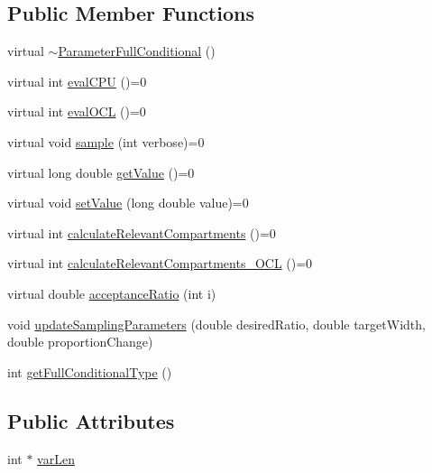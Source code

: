 \subsection*{Public Member Functions}
\begin{DoxyCompactItemize}
\item 
virtual \hyperlink{classSpatialSEIR_1_1ParameterFullConditional_a8f86a572d719ff60c9620f17ae7d99bf}{$\sim$\-Parameter\-Full\-Conditional} ()
\item 
virtual int \hyperlink{classSpatialSEIR_1_1ParameterFullConditional_a186bd19fdeb52ca4522f56fb880201dd}{eval\-C\-P\-U} ()=0
\item 
virtual int \hyperlink{classSpatialSEIR_1_1ParameterFullConditional_ac4cfb13dace7f72e8136c45d9e959eec}{eval\-O\-C\-L} ()=0
\item 
virtual void \hyperlink{classSpatialSEIR_1_1ParameterFullConditional_a651e22b15782acb6bd80be12bd476693}{sample} (int verbose)=0
\item 
virtual long double \hyperlink{classSpatialSEIR_1_1ParameterFullConditional_a901368d385809e77179b9fa7532adfec}{get\-Value} ()=0
\item 
virtual void \hyperlink{classSpatialSEIR_1_1ParameterFullConditional_adf03f213e27d26f120b574d6dd86ffc3}{set\-Value} (long double value)=0
\item 
virtual int \hyperlink{classSpatialSEIR_1_1ParameterFullConditional_a65c39a2c3ca56e2f194b78cd362d35f9}{calculate\-Relevant\-Compartments} ()=0
\item 
virtual int \hyperlink{classSpatialSEIR_1_1ParameterFullConditional_af40754537736a64f58848e0368b001fb}{calculate\-Relevant\-Compartments\-\_\-\-O\-C\-L} ()=0
\item 
virtual double \hyperlink{classSpatialSEIR_1_1ParameterFullConditional_a0ddd01b6687b2617550a83f1feb5fa58}{acceptance\-Ratio} (int i)
\item 
void \hyperlink{classSpatialSEIR_1_1ParameterFullConditional_abae767010981e8f05e6c5e957739dabc}{update\-Sampling\-Parameters} (double desired\-Ratio, double target\-Width, double proportion\-Change)
\item 
int \hyperlink{classSpatialSEIR_1_1ParameterFullConditional_a2f2b5de88ed6e34e06b9b95413bfbdfc}{get\-Full\-Conditional\-Type} ()
\end{DoxyCompactItemize}
\subsection*{Public Attributes}
\begin{DoxyCompactItemize}
\item 
int $\ast$ \hyperlink{classSpatialSEIR_1_1ParameterFullConditional_a37e6c5effe2f808191fdc1eaf137270c}{var\-Len}
\end{DoxyCompactItemize}


